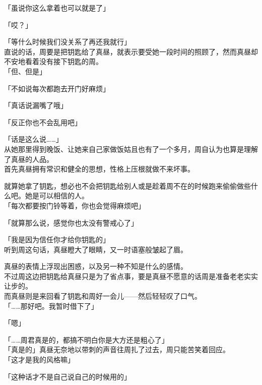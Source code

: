 「虽说你这么拿着也可以就是了」

「哎？」

「等什么时候我们没关系了再还我就行」\\

直说的话，周要是把钥匙给了真昼，就表示要受她一段时间的照顾了，然而真昼却不安地看着没有接下钥匙的周。\\

「但、但是」

「不如说每次都跑去开门好麻烦」

「真话说漏嘴了哦」

「反正你也不会乱用吧」

「话是这么说……」\\

从她那里得到晚饭、让她来自己家做饭姑且也有了一个多月，周自认为也算是理解了真昼的人品。\\

首先真昼拥有常识和健全的思想，性格上压根就做不来坏事。

就算她拿了钥匙，想必也不会把钥匙给别人或是趁着周不在的时候跑来偷偷做些什么吧。她是可以相信的人。\\

「每次都要按门铃等着，你也会觉得麻烦吧」

「就算那么说，感觉你也太没有警戒心了」

「我是因为信任你才给你钥匙的」\\

听到周这句话，真昼瞪大了眼睛，又一时语塞般皱起了眉。

真昼的表情上浮现出困惑，以及另一种不知是什么的感情。\\

不过周这边把钥匙给真昼只是为了省点事，要是真昼不愿意的话周是准备老老实实让步的。\\

而真昼则是来回看了钥匙和周好一会儿——然后轻轻叹了口气。\\

「……那好吧。我暂时借下了」

「嗯」

「……周君真是的，都搞不明白你是大方还是粗心了」\\

「真是的」真昼无奈地以带刺的声音往周扎了过去，周只能苦笑着回应。\\

「这才是我的风格嘛」

「这种话才不是自己说自己的时候用的」\\


